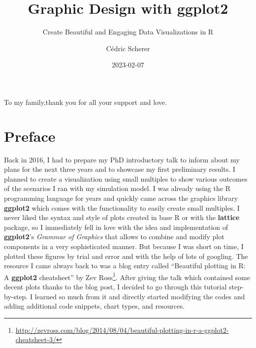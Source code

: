 \documentclass[
]{krantz}
\title{Graphic Design with ggplot2}
\subtitle{Create Beautiful and Engaging Data Visualizations in R}
\author{Cédric Scherer}
\date{2023-02-07}
\renewcommand{\href}[2]{#2\footnote{\url{#1}}}
\begin{document}
\maketitle


\thispagestyle{empty}

\begin{center}
To my family,thank you for all your support and love.
\end{center}

\setlength{\abovedisplayskip}{-5pt}
\setlength{\abovedisplayshortskip}{-5pt}

{
\hypersetup{linkcolor=}
\setcounter{tocdepth}{2}
\tableofcontents
}
\listoffigures
\listoftables
\hypertarget{preface}{%
\chapter*{Preface}\label{preface}}


Back in 2016, I had to prepare my PhD introductory talk to inform about my plans for the next three years and to showcase my first preliminary results. I planned to create a visualization using small multiples to show various outcomes of the scenarios I ran with my simulation model. I was already using the R programming language for years and quickly came across the graphics library \textbf{ggplot2} which comes with the functionality to easily create small multiples. I never liked the syntax and style of plots created in base R or with the \textbf{lattice} package, so I immediately fell in love with the idea and implementation of \textbf{ggplot2}'s \emph{Grammar of Graphics} that allows to combine and modify plot components in a very sophisticated manner. But because I was short on time, I plotted these figures by trial and error and with the help of lots of googling. The resource I came always back to was a blog entry called \href{http://zevross.com/blog/2014/08/04/beautiful-plotting-in-r-a-ggplot2-cheatsheet-3/}{``Beautiful plotting in R: A \textbf{ggplot2} cheatsheet'' by Zev Ross}. After giving the talk which contained some decent plots thanks to the blog post, I decided to go through this tutorial step-by-step. I learned so much from it and directly started modifying the codes and adding additional code snippets, chart types, and resources.
\end{document}
